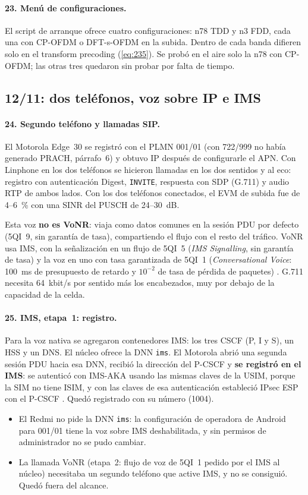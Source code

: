 \paragraph{23. Menú de configuraciones.} El script de arranque ofrece cuatro configuraciones: n78 TDD y n3 FDD, cada una con CP-OFDM o DFT-s-OFDM en la subida. Dentro de cada banda difieren solo en el transform precoding (\cref{eq:235}). Se probó en el aire solo la n78 con CP-OFDM; las otras tres quedaron sin probar por falta de tiempo.

\subsection{12/11: dos teléfonos, voz sobre IP e IMS}
\paragraph{24. Segundo teléfono y llamadas SIP.} El Motorola Edge~30 se registró con el PLMN 001/01 (con 722/999 no había generado PRACH, párrafo~6) y obtuvo IP después de configurarle el APN. Con Linphone en los dos teléfonos se hicieron llamadas en los dos sentidos y al eco: registro con autenticación Digest, \texttt{INVITE}, respuesta con SDP (G.711) y audio RTP de ambos lados. Con los dos teléfonos conectados, el EVM de subida fue de 4--6~\% con una SINR del PUSCH de 24--30~dB.

Esta voz \textbf{no es VoNR}: viaja como datos comunes en la sesión PDU por defecto (5QI~9, sin garantía de tasa), compartiendo el flujo con el resto del tráfico. VoNR usa IMS, con la señalización en un flujo de 5QI~5 (\emph{IMS Signalling}, sin garantía de tasa) y la voz en uno con tasa garantizada de 5QI~1 (\emph{Conversational Voice}: 100~ms de presupuesto de retardo y $10^{-2}$ de tasa de pérdida de paquetes) \cite[tabla 5.7.4-1]{ts23501}. G.711 necesita 64~kbit/s por sentido más los encabezados, muy por debajo de la capacidad de la celda.

\paragraph{25. IMS, etapa~1: registro.} Para la voz nativa se agregaron contenedores IMS: los tres CSCF (P, I y S), un HSS y un DNS. El núcleo ofrece la DNN \texttt{ims}. El Motorola abrió una segunda sesión PDU hacia esa DNN, recibió la dirección del P-CSCF y \textbf{se registró en el IMS}: se autenticó con IMS-AKA usando las mismas claves de la USIM, porque la SIM no tiene ISIM, y con las claves de esa autenticación estableció IPsec ESP con el P-CSCF \cite[§7.1 y §8.2]{ts33203}. Quedó registrado con su número (1004).
\begin{itemize}
  \item El Redmi no pide la DNN \texttt{ims}: la configuración de operadora de Android para 001/01 tiene la voz sobre IMS deshabilitada, y sin permisos de administrador no se pudo cambiar.
  \item La llamada VoNR (etapa~2: flujo de voz de 5QI~1 pedido por el IMS al núcleo) necesitaba un segundo teléfono que active IMS, y no se consiguió. Quedó fuera del alcance.
\end{itemize}

